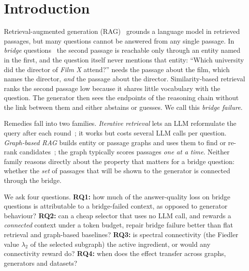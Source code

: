 \section{Introduction}
\label{sec:intro}

Retrieval-augmented generation (RAG)~\cite{lewis2020rag} grounds a language model in retrieved passages, but many questions cannot be answered from any single passage. In \emph{bridge} questions~\cite{yang2018hotpotqa} the second passage is reachable only through an entity named in the first, and the question itself never mentions that entity: ``Which university did the director of \emph{Film X} attend?'' needs the passage about the film, which names the director, \emph{and} the passage about the director. Similarity-based retrieval ranks the second passage low because it shares little vocabulary with the question. The generator then sees the endpoints of the reasoning chain without the link between them and either abstains or guesses. We call this \emph{bridge failure}.

Remedies fall into two families. \emph{Iterative retrieval} lets an LLM reformulate the query after each round~\cite{trivedi2023ircot,asai2024selfrag}; it works but costs several LLM calls per question. \emph{Graph-based RAG} builds entity or passage graphs and uses them to find or re-rank candidates~\cite{edge2024graphrag,guo2024lightrag,gutierrez2025hipporag2,he2024gretriever,rappazzo2024gem}; the graph typically scores passages \emph{one at a time}. Neither family reasons directly about the property that matters for a bridge question: whether the \emph{set} of passages that will be shown to the generator is connected through the bridge.

We ask four questions. \textbf{RQ1:} how much of the answer-quality loss on bridge questions is attributable to a bridge-failed context, as opposed to generator behaviour? \textbf{RQ2:} can a cheap selector that uses no LLM call, and rewards a \emph{connected} context under a token budget, repair bridge failure better than flat retrieval and graph-based baselines? \textbf{RQ3:} is spectral connectivity (the Fiedler value $\lambda_2$ of the selected subgraph) the active ingredient, or would any connectivity reward do? \textbf{RQ4:} when does the effect transfer across graphs, generators and datasets?

